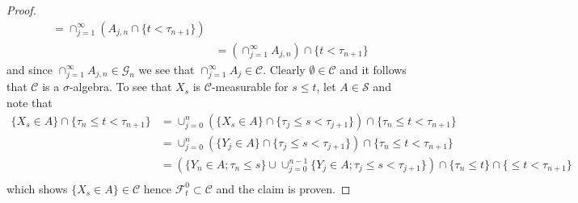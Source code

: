 \begin{proof}
\begin{align*}
= \cap_{j=1}^\infty \left( A_{j,n} \cap \lbrace t < \tau_{n+1} \rbrace \right) \\
&= \left( \cap_{j=1}^\infty A_{j,n} \right) \cap \lbrace t < \tau_{n+1} \rbrace
\end{align*}
and since $\cap_{j=1}^\infty A_{j,n} \in \mathcal{G}_n$ we see that $\cap_{j=1}^\infty A_j \in \mathcal{C}$.  Clearly $\emptyset \in \mathcal{C}$ and it follows that $\mathcal{C}$ is a $\sigma$-algebra.  To see that $X_s$ is $\mathcal{C}$-measurable for $s \leq t$, let $A \in \mathcal{S}$ and note that 
\begin{align*}
\lbrace X_s \in A \rbrace \cap \lbrace \tau_n \leq t < \tau_{n+1} \rbrace 
&= \cup_{j=0}^n \left (\lbrace X_s \in A \rbrace \cap \lbrace \tau_j \leq s < \tau_{j+1} \rbrace \right ) \cap \lbrace \tau_n \leq t < \tau_{n+1} \rbrace  \\
&= \cup_{j=0}^n \left (\lbrace Y_j \in A \rbrace \cap \lbrace \tau_j \leq s < \tau_{j+1} \rbrace \right ) \cap \lbrace \tau_n \leq t < \tau_{n+1} \rbrace  \\
&= \left (\lbrace Y_n \in A ; \tau_n \leq s \rbrace \cup \cup_{j=0}^{n-1} \lbrace Y_j \in A ; \tau_j \leq s < \tau_{j+1} \rbrace \right ) \cap \lbrace \tau_n \leq t \rbrace 
\cap \lbrace \leq t < \tau_{n+1} \rbrace  \\
\end{align*}
which shows $\lbrace X_s \in A \rbrace \in \mathcal{C}$ hence $\mathcal{F}^0_t \subset \mathcal{C}$ and the claim is proven.



\end{proof}
